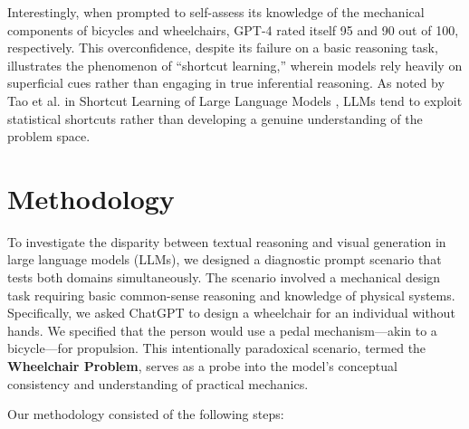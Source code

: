 \documentclass[11pt]{scrartcl}
\begin{document}
Interestingly, when prompted to self-assess its knowledge of the mechanical components of bicycles and wheelchairs, GPT-4 rated itself 95 and 90 out of 100, respectively. This overconfidence, despite its failure on a basic reasoning task, illustrates the phenomenon of “shortcut learning,” wherein models rely heavily on superficial cues rather than engaging in true inferential reasoning. As noted by Tao et al. in Shortcut Learning of Large Language Models \cite{ref5}, LLMs tend to exploit statistical shortcuts rather than developing a genuine understanding of the problem space.\\

\section*{Methodology}

To investigate the disparity between textual reasoning and visual generation in large language models (LLMs), we designed a diagnostic prompt scenario that tests both domains simultaneously. The scenario involved a mechanical design task requiring basic common-sense reasoning and knowledge of physical systems. Specifically, we asked ChatGPT to design a wheelchair for an individual without hands. We specified that the person would use a pedal mechanism—akin to a bicycle—for propulsion. This intentionally paradoxical scenario, termed the \textbf{Wheelchair Problem}, serves as a probe into the model's conceptual consistency and understanding of practical mechanics.

Our methodology consisted of the following steps:
\end{document}
